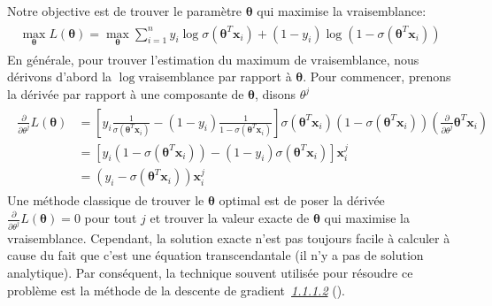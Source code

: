 \documentclass[letterpaper,11pt,english]{sphinxmanual}
\begin{document}
\sphinxAtStartPar
Notre objective est de trouver le paramètre \(\boldsymbol{\theta}\)
qui maximise la vraisemblance:
\begin{equation}\label{equation:chapter3:chapter3:37}
\begin{split}\begin{aligned}
 \max_{\boldsymbol{\theta}}
 L(\boldsymbol{\theta}) = \max_{\boldsymbol{\theta}}\sum_{i=1}^{n}y_{i}\log\sigma \left(\boldsymbol{\theta}^{T}\mathbf{x}_i \right) + \left(1-y_{i}\right)\log \left(1-\sigma(\boldsymbol{\theta}^{T}\mathbf{x}_i)\right)   \end{aligned}\end{split}
\end{equation}
\sphinxAtStartPar
En générale, pour trouver l’estimation du maximum de vraisemblance, nous
dérivons d’abord la \(\log\)\sphinxhyphen{}vraisemblance par rapport à
\(\boldsymbol{\theta}\). Pour commencer, prenons la dérivée par
rapport à une composante de \(\boldsymbol{\theta}\), disons
\(\theta^j\)
\begin{equation}\label{equation:chapter3:chapter3:38}
\begin{split}\begin{aligned}
\frac{\partial}{\partial \theta^j}L(\boldsymbol{\theta})
&=\left[ y_i\frac{1}{\sigma(\boldsymbol{\theta}^{T}\mathbf{x}_i)}-(1-y_i)\frac{1}{1-\sigma(\boldsymbol{\theta}^{T}\mathbf{x}_i)}\right]\sigma(\boldsymbol{\theta}^{T}\mathbf{x}_i)(1-\sigma(\boldsymbol{\theta}^{T}\mathbf{x}_i))(\frac{\partial}{\partial \theta^j}\boldsymbol{\theta}^{T}\mathbf{x}_i)\\
&=\left[y_i(1-\sigma(\boldsymbol{\theta}^{T}\mathbf{x}_i))-(1-y_{i})\sigma(\boldsymbol{\theta}^{T}\mathbf{x}_i)\right]\mathbf{x}_i^{j}\\
&=\left(y_{i}-\sigma(\boldsymbol{\theta}^{T} \mathbf{x}_i)\right)\mathbf{x}_i^{j}\end{aligned}\end{split}
\end{equation}
\sphinxAtStartPar
Une méthode classique de trouver le \(\boldsymbol{\theta}\) optimal
est de poser la dérivée
\(\displaystyle \frac{\partial}{\partial \theta^j}L(\boldsymbol{\theta})=0\)
pour tout \(j\) et trouver la valeur exacte de
\(\boldsymbol{\theta}\) qui maximise la vraisemblance. Cependant, la
solution exacte n’est pas toujours facile à calculer à cause du fait que
c’est une équation transcendantale (il n’y a pas de solution
analytique). Par conséquent, la technique souvent utilisée pour résoudre
ce problème est la méthode de la descente de gradient {\hyperref[\detokenize{chapter3:GD}]{\emph{1.1.1.2}}} ().
\end{document}

